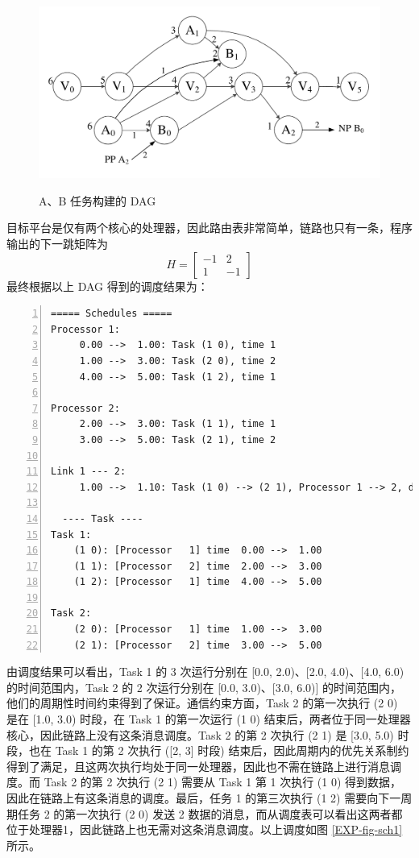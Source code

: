 \begin{figure}[!hbt]
  \centering
  \includegraphics[height=28ex]{figure/EXP-DAG.pdf}\\
  \caption{A、B 任务构建的 DAG}\label{EXP-fig-DAG}
\end{figure}


目标平台是仅有两个核心的处理器，因此路由表非常简单，链路也只有一条，程序输出的下一跳矩阵为
$$H=\begin{bmatrix}-1 & 2\\ 1 & -1\end{bmatrix}$$
最终根据以上 DAG
得到的调度结果为：
\begin{Verbatim}[numbers=left,frame=single,xleftmargin=50pt,
samepage=true,fontsize=\small,baselinestretch=1.2]
===== Schedules =====
Processor 1:
     0.00 -->  1.00: Task (1 0), time 1
     1.00 -->  3.00: Task (2 0), time 2
     4.00 -->  5.00: Task (1 2), time 1

Processor 2:
     2.00 -->  3.00: Task (1 1), time 1
     3.00 -->  5.00: Task (2 1), time 2

Link 1 --- 2:
     1.00 -->  1.10: Task (1 0) --> (2 1), Processor 1 --> 2, data 1

  ---- Task ----
Task 1:
    (1 0): [Processor   1] time  0.00 -->  1.00
    (1 1): [Processor   2] time  2.00 -->  3.00
    (1 2): [Processor   1] time  4.00 -->  5.00

Task 2:
    (2 0): [Processor   1] time  1.00 -->  3.00
    (2 1): [Processor   2] time  3.00 -->  5.00
\end{Verbatim}
由调度结果可以看出，Task 1 的 3 次运行分别在 [0.0, 2.0)、[2.0, 4.0)、[4.0, 6.0) 的时间范围内，Task 2 的 2 次运行分别在 [0.0, 3.0)、[3.0, 6.0)] 的时间范围内，他们的周期性时间约束得到了保证。通信约束方面，Task 2 的第一次执行 (2 0) 是在 [1.0, 3.0) 时段，在 Task 1 的第一次运行 (1 0) 结束后，两者位于同一处理器核心，因此链路上没有这条消息调度。Task 2 的第 2 次执行 (2 1) 是 [3.0, 5.0) 时段，也在 Task 1 的第 2 次执行 ([2, 3] 时段) 结束后，因此周期内的优先关系制约得到了满足，且这两次执行均处于同一处理器，因此也不需在链路上进行消息调度。而 Task 2 的第 2 次执行 (2 1) 需要从 Task 1 第 1 次执行 (1 0) 得到数据，因此在链路上有这条消息的调度。最后，任务 1 的第三次执行 (1 2) 需要向下一周期任务 2 的第一次执行 (2 0) 发送 2 数据的消息，而从调度表可以看出这两者都位于处理器1，因此链路上也无需对这条消息调度。以上调度如图 \ref{EXP-fig-sch1} 所示。


